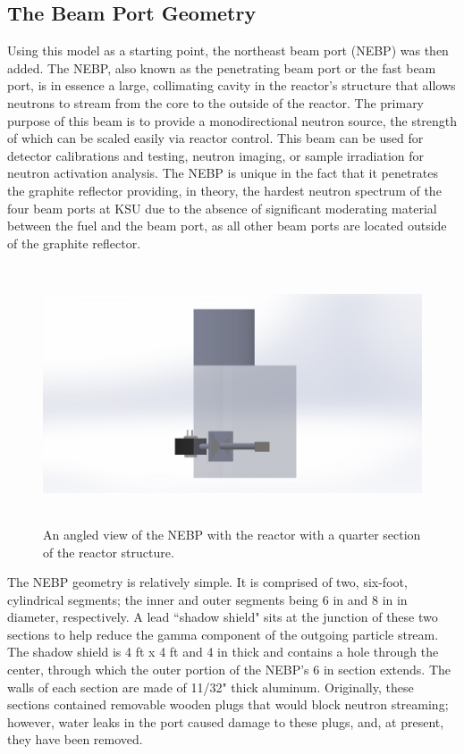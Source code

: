 \subsection{The Beam Port Geometry}

Using this model as a starting point, the northeast beam port (NEBP) was then added.
The NEBP, also known as the penetrating beam port or the fast beam port, is in essence a large, collimating cavity in the reactor's structure that allows neutrons to stream from the core to the outside of the reactor.
The primary purpose of this beam is to provide a monodirectional neutron source, the strength of which can be scaled easily via reactor control.
This beam can be used for detector calibrations and testing, neutron imaging, or sample irradiation for neutron activation analysis.
The NEBP is unique in the fact that it penetrates the graphite reflector providing, in theory, the hardest neutron spectrum of the four beam ports at KSU due to the absence of significant moderating material between the fuel and the beam port, as all other beam ports are located outside of the graphite reflector.

\begin{figure}[htb]
\centering
\includegraphics[height=3in]{tex/figures/solidworksangled.jpg}
\caption[Solidworks Angled NEBP]{An angled view of the NEBP with the reactor with a quarter section of the reactor structure.}
\label{fig:solidworksangled}
\end{figure}


The NEBP geometry is relatively simple.
It is comprised of two, six-foot, cylindrical segments; the inner and outer segments being 6 in and 8 in in diameter, respectively.
A lead ``shadow shield" sits at the junction of these two sections to help reduce the gamma component of the outgoing particle stream.
The shadow shield is 4 ft x 4 ft and 4 in thick and contains a hole through the center, through which the outer portion of the NEBP's 6 in section extends.
The walls of each section are made of 11/32" thick aluminum.
Originally, these sections contained removable wooden plugs that would block neutron streaming; however, water leaks in the port caused damage to these plugs, and, at present, they have been removed.

